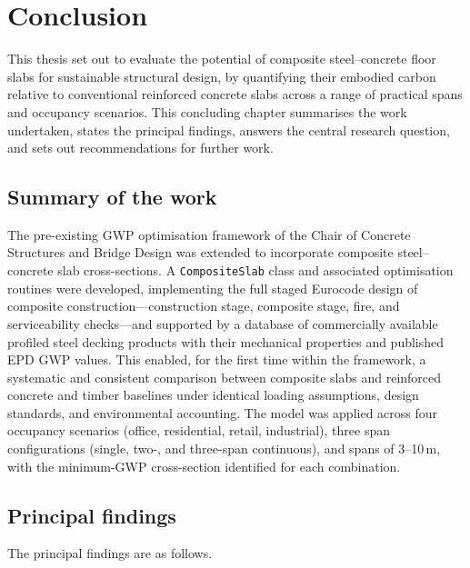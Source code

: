 \section{Conclusion}
\label{sixthchapter}

This thesis set out to evaluate the potential of composite steel--concrete floor slabs for sustainable structural design, by quantifying their embodied carbon relative to conventional reinforced concrete slabs across a range of practical spans and occupancy scenarios. This concluding chapter summarises the work undertaken, states the principal findings, answers the central research question, and sets out recommendations for further work.

\subsection{Summary of the work}
\label{sec:concl_summary}
The pre-existing GWP optimisation framework of the Chair of Concrete Structures and Bridge Design was extended to incorporate composite steel--concrete slab cross-sections. A \texttt{CompositeSlab} class and associated optimisation routines were developed, implementing the full staged Eurocode design of composite construction---construction stage, composite stage, fire, and serviceability checks---and supported by a database of commercially available profiled steel decking products with their mechanical properties and published EPD GWP values. This enabled, for the first time within the framework, a systematic and consistent comparison between composite slabs and reinforced concrete and timber baselines under identical loading assumptions, design standards, and environmental accounting. The model was applied across four occupancy scenarios (office, residential, retail, industrial), three span configurations (single, two-, and three-span continuous), and spans of 3--10\,m, with the minimum-GWP cross-section identified for each combination.

\subsection{Principal findings}
\label{sec:concl_findings}
The principal findings are as follows.

